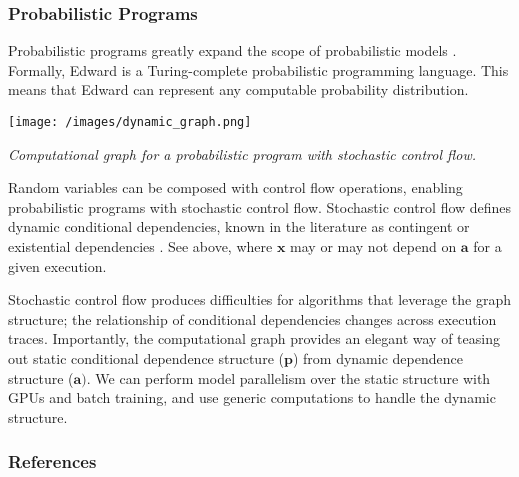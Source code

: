 \subsubsection{Probabilistic Programs}

Probabilistic programs greatly expand the scope of probabilistic
models \citep{goodman2012church}.
Formally, Edward is a Turing-complete probabilistic programming
language. This means that Edward can represent any computable
probability distribution.

\texttt{[image: /images/dynamic\_graph.png]}

{\small\textit{Computational graph for a probabilistic program with stochastic control flow.}}

Random variables can be composed with control flow operations,
enabling probabilistic programs with stochastic control flow.
%
Stochastic control flow defines dynamic conditional dependencies,
known in the literature as contingent or existential dependencies
\citep{mansinghka2014venture,wu2016swift}.
See above, where $\mathbf{x}$ may or may not depend on $\mathbf{a}$
for a given execution.

Stochastic control flow produces difficulties for algorithms that
leverage the graph structure; the relationship of conditional
dependencies changes across execution traces.
Importantly, the computational graph provides an elegant way of
teasing out static conditional dependence structure ($\mathbf{p}$)
from dynamic dependence structure ($\mathbf{a})$. We can perform
model parallelism over the static structure with GPUs and batch
training, and use generic computations to handle the dynamic
structure.

\subsubsection{References}\label{references}
